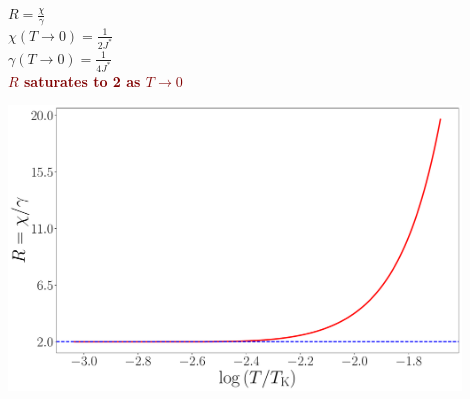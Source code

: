 \documentclass[aspectratio=169]{beamer}
\newcommand{\focus}[1]{\textcolor{maroon}{\textbf{#1}}}
\begin{document}
\begin{frame}{}
{\begin{minipage}{0.35\textwidth}
\begin{flushleft}
	\(R = \frac{\chi}{\gamma}\)\\[15pt]
	\(\chi(T \to 0) = \frac{1}{2J^*}\)\\[15pt]
	\(\gamma(T \to 0) = \frac{1}{4J^*}\)\\[15pt]
	\focus{\(R\) saturates to 2 as \(T \to 0\)}
\end{flushleft}
\end{minipage}
\hspace*{\fill}
\begin{minipage}{0.6\textwidth}
\includegraphics[width=0.9\textwidth]{figures/wilsonratio.pdf}
\end{minipage}
}
\end{frame}
\end{document}
